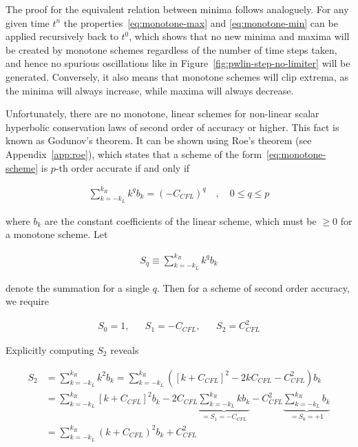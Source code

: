 The proof for the equivalent relation between minima follows analoguely. For any given time $t^n$
the properties~\ref{eq:monotone-max} and \ref{eq:monotone-min} can be applied recursively back to
$t^0$, which shows that no new minima and maxima will be created by monotone schemes regardless of
the number of time steps taken, and hence no spurious oscillations like in
Figure~\ref{fig:pwlin-step-no-limiter} will be generated. Conversely, it also means that monotone
schemes will clip extrema, as the minima will always increase, while maxima will always decrease.

Unfortunately, there are no monotone, linear schemes for non-linear scalar hyperbolic conservation
laws of second order of accuracy or higher. This fact is known as Godunov's theorem.  It can be
shown using Roe's theorem (see Appendix~\ref{app:roe}), which states that a scheme of the
form~\ref{eq:monotone-scheme} is
$p$-th order accurate if and only if

\begin{align}
    \sum_{k = -k_L}^{k_R} k^q b_k = (-C_{CFL})^q \quad , \quad 0 \leq q \leq p
\end{align}

where $b_k$ are the constant coefficients of the linear scheme, which must be $\geq 0$ for a
monotone scheme. Let

\begin{align}
    S_q \equiv \sum_{k = -k_L}^{k_R} k^q b_k
\end{align}

denote the summation for a single $q$.  Then for a scheme of second order accuracy, we require

\begin{align}
    S_0 = 1, && S_1 = -C_{CFL}, && S_2 = C_{CFL}^2
\end{align}

Explicitly computing $S_2$ reveals

\begin{align}
    S_2
    &= \sum_{k = -k_L}^{k_R} k^2 b_k
    = \sum_{k = -k_L}^{k_R} ([k + C_{CFL}]^2 - 2kC_{CFL} - C_{CFL}^2) b_k \\
    &= \sum_{k = -k_L}^{k_R} [k + C_{CFL}]^2  b_k
    - 2 C_{CFL} \underbrace{\sum_{k = -k_L}^{k_R} k b_k}_{= S_1 = -C_{CFL}}
    - C_{CFL}^2 \underbrace{\sum_{k = -k_L}^{k_R} b_k}_{= S_0 = +1} \\
    &= \sum_{k = -k_L}^{k_R} (k + C_{CFL})^2 b_k + C_{CFL}^2 \label{eq:godunov-theorem-S2}
\end{align}

